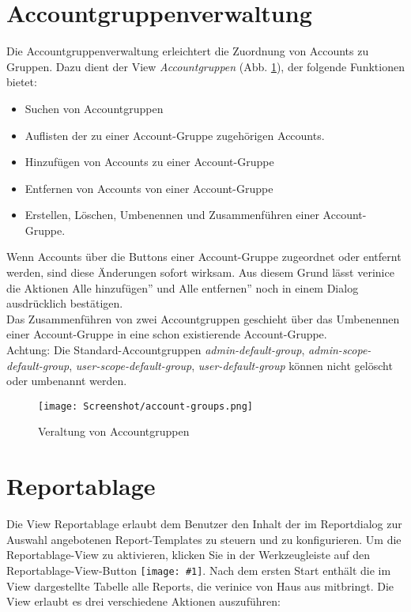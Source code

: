 \documentclass[a4paper,10pt]{book}
\newcommand{\icon}[1]{\texttt{[image: \#1]}}
\begin{document}
\section{Accountgruppenverwaltung}
\label{Accountgruppenverwaltung}

Die Accountgruppenverwaltung erleichtert die Zuordnung von Accounts
zu Gruppen. Dazu dient der View \textit{Accountgruppen}
(Abb. \ref{fig:account-groups-managment}), der folgende Funktionen
bietet:

\begin{itemize}
\item Suchen von Accountgruppen
\item Auflisten der zu einer Account-Gruppe zugehörigen Accounts.
\item Hinzufügen von Accounts zu einer Account-Gruppe
\item Entfernen von Accounts von einer Account-Gruppe
\item Erstellen, Löschen, Umbenennen und Zusammenführen einer
  Account-Gruppe.
\end{itemize}

Wenn Accounts über die Buttons einer Account-Gruppe zugeordnet oder
entfernt werden, sind diese Änderungen sofort wirksam. Aus diesem
Grund lässt verinice die Aktionen \glqq Alle hinzufügen'' und \glqq
Alle entfernen'' noch in einem Dialog ausdrücklich bestätigen.\\

Das Zusammenführen von zwei Accountgruppen geschieht über das
Umbenennen einer Account-Gruppe in eine schon existierende
Account-Gruppe.\\

Achtung: Die Standard-Accountgruppen \textit{admin-default-group},
\textit{admin-scope-default-group}, \textit{user-scope-default-group},
\textit{user-default-group} können nicht gelöscht oder umbenannt
werden.

\begin{figure}
  \centering
  \texttt{[image: Screenshot/account-groups.png]}
  \caption{Veraltung von Accountgruppen}
\label{fig:account-groups-managment}
\end{figure}

\section{Reportablage \label{reportdeposit}}
Die View Reportablage erlaubt dem Benutzer den Inhalt der im Reportdialog zur Auswahl angebotenen Report-Templates zu steuern und zu konfigurieren.
Um die Reportablage-View zu aktivieren, klicken Sie
in der Werkzeugleiste auf den Reportablage-View-Button \icon{Icon/folder_table.png}.
Nach dem ersten Start enthält die im View dargestellte Tabelle alle Reports, die verinice von Haus aus mitbringt.
Die View erlaubt es drei verschiedene Aktionen auszuführen:
\end{document}
